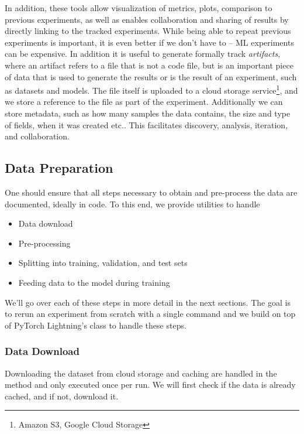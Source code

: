 In addition, these tools allow visualization of metrics, plots, comparison to previous experiments, as well as enables collaboration and sharing of results by directly linking to the tracked experiments.
While being able to repeat previous experiments is important, it is even better if we don't have to -- ML experiments can be expensive.
In addition it is useful to generate formally track \textit{artifacts}, where an artifact refers to a file that is not a code file, but is an important piece of data that is used to generate the results or is the result of an experiment, such as datasets and models.
The file itself is uploaded to a cloud storage service\footnote{Amazon S3, Google Cloud Storage}, and we store a reference to the file as part of the experiment.
Additionally we can store metadata, such as how many samples the data contains, the size and type of fields, when it was created etc..
This facilitates discovery, analysis, iteration, and collaboration.


\subsection{Data Preparation}
One should ensure that all steps necessary to obtain and pre-process the data are documented, ideally in code.
To this end, we provide utilities to handle
\begin{itemize}
    \item Data download
    \item Pre-processing
    \item Splitting into training, validation, and test sets
    \item Feeding data to the model during training
\end{itemize}

We'll go over each of these steps in more detail in the next sections.
The goal is to rerun an experiment from scratch with a single command and we build on top of PyTorch Lightning's  class to handle these steps.
\subsubsection{Data Download}
Downloading the dataset from cloud storage and caching are handled in the  method and only executed once per run.
We will first check if the data is already cached, and if not, download it.

